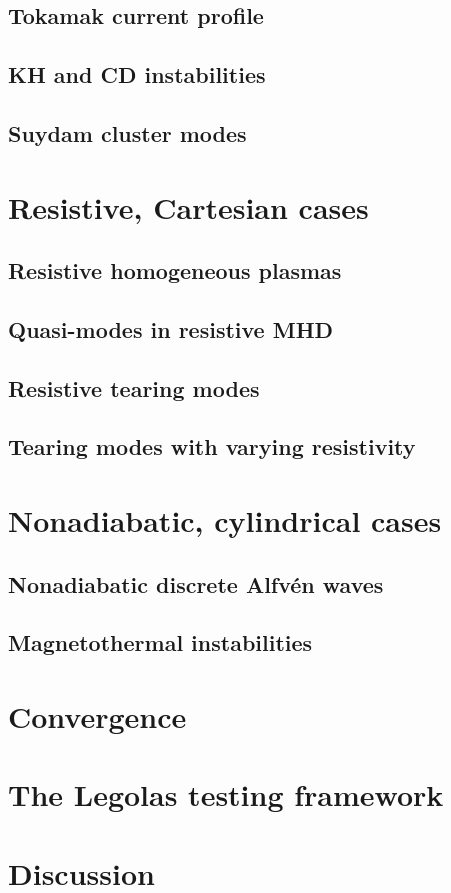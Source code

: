 \subsection{Tokamak current profile}
\subsection{KH and CD instabilities}
\subsection{Suydam cluster modes}

\section{Resistive, Cartesian cases}
\subsection{Resistive homogeneous plasmas}
\subsection{Quasi-modes in resistive MHD}
\subsection{Resistive tearing modes}
\subsection{Tearing modes with varying resistivity}

\section{Nonadiabatic, cylindrical cases}
\subsection{Nonadiabatic discrete Alfv\'en waves}
\subsection{Magnetothermal instabilities}

\section{Convergence}

\section{The Legolas testing framework}

\section{Discussion}





\cleardoublepage
